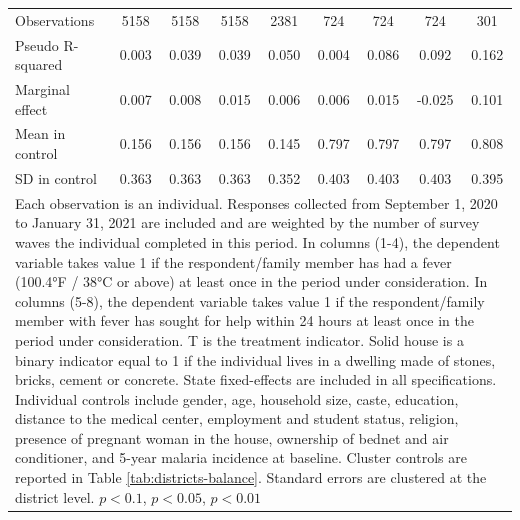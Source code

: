 {{\begin{tabular}{l*{8}{c}}
\hline
Observations    &\num{5158}         &\num{5158}         &\num{5158}         &\num{2381}         &\num{724}         &\num{724}         &\num{724}         &\num{301}         \\
Pseudo R-squared&    0.003         &    0.039         &    0.039         &    0.050         &    0.004         &    0.086         &    0.092         &    0.162         \\
Marginal effect &    0.007         &    0.008         &    0.015         &    0.006         &    0.006         &    0.015         &   -0.025         &    0.101         \\
Mean in control &    0.156         &    0.156         &    0.156         &    0.145         &    0.797         &    0.797         &    0.797         &    0.808         \\
SD in control   &    0.363         &    0.363         &    0.363         &    0.352         &    0.403         &    0.403         &    0.403         &    0.395         \\
\hline\hline
\multicolumn{9}{p{1.02\linewidth}}{\scriptsize Each observation is an individual. Responses collected from September 1, 2020 to January 31, 2021 are included and are weighted by the number of survey waves the individual completed in this period. In columns (1-4), the dependent variable takes value 1 if the respondent/family member has had a fever (100.4°F / 38°C or above) at least once in the period under consideration. In columns (5-8), the dependent variable takes value 1 if the respondent/family member with fever has sought for help within 24 hours at least once in the period under consideration. T is the treatment indicator. Solid house is a binary indicator equal to 1 if the individual lives in a dwelling made of stones, bricks, cement or concrete. State fixed-effects are included in all specifications. Individual controls include gender, age, household size, caste, education, distance to the medical center, employment and student status, religion, presence of pregnant woman in the house, ownership of bednet and air conditioner, and 5-year malaria incidence at baseline. Cluster controls are reported in Table \ref{tab:districts-balance}. Standard errors are clustered at the district level. \sym{*} \(p<0.1\), \sym{**} \(p<0.05\), \sym{***} \(p<0.01\)}\\
\end{tabular}
}%

}
